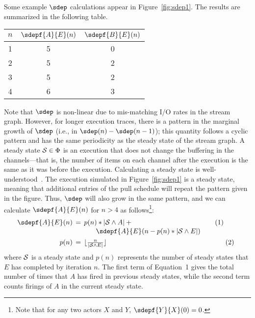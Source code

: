 Some example $\sdep$ calculations appear in Figure~\ref{fig:sdep1}.
The results are summarized in the following table.
\begin{center}
\begin{tabular}{|c|c|c|}
\hline
$n$ & $\sdepf{A}{E}(n)$ & $\sdepf{B}{E}(n)$ \\
\hline \hline
1 & 5 & 0 \\ \hline
2 & 5 & 2 \\ \hline
3 & 5 & 2 \\ \hline
4 & 6 & 3 \\ \hline
\end{tabular}
\end{center}
Note that $\sdep$ is non-linear due to mis-matching I/O rates in the
stream graph.  However, for longer execution traces, there is a
pattern in the marginal growth of $\sdep$ (i.e., in $\sdep(n) -
\sdep(n-1)$); this quantity follows a cyclic pattern and has the same
periodicity as the steady state of the stream graph.  A steady state
${\cal S} \in \Phi$ is an execution that does not change the buffering
in the channels---that is, the number of items on each channel after
the execution is the same as it was before the execution.  Calculating
a steady state is well-understood~\cite{LM87-i}.  The execution
simulated in Figure~\ref{fig:sdep1} is a steady state, meaning that
additional entries of the pull schedule will repeat the pattern given
in the figure.  Thus, $\sdep$ will also grow in the same pattern, and
we can calculate $\sdepf{A}{E}(n)$ for $n > 4$ as
follows\footnote{Note that for any two actors $X$ and $Y$,
$\sdepf{Y}{X}(0) = 0$.}:
\begin{equation}
\label{eq:sdep-steady}
\nonumber
\hspace{-4.5pt}\begin{array}{rcl}
\sdepf{A}{E}(n) \hspace{-5.5pt}&=&\hspace{-5.5pt} p(n) * |{\cal S} \wedge A| + ~~~~~~~~~~~~~~~~~~~~~~~~~~~~~\hspace{16.3pt}~~(1)\\[0.2Ex]
~&~&\mbox{~}\hspace{8.5pt} \sdepf{A}{E}(n - p(n) * |{\cal S} \wedge E|) \\[1Ex]
p(n) \hspace{-5.5pt}&=&\hspace{-5.5pt} \lfloor \frac{n}{|{\cal S} \wedge E|} \rfloor~~~~~~~~~~~~~~~~~~~~~~~~~~~~~~~~~~~~~\hspace{20pt}~~~~~~~~~(2) %
\end{array}
\end{equation}
where ${\cal S}$ is a steady state and $p(n)$ represents the number of
steady states that $E$ has completed by iteration $n$.  The first term
of Equation~1 gives the total number of times that $A$ has fired in
previous steady states, while the second term counts firings of $A$ in
the current steady state.

